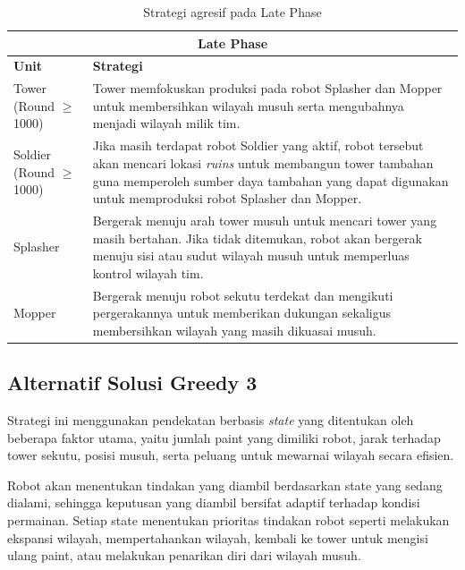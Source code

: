 \documentclass{article}
\renewcommand{\arraystretch}{1.3}
\begin{document}
\begin{table}[H]
\centering
\renewcommand{\arraystretch}{1.2}
\begin{tabular}{|p{3cm}|p{11cm}|}
\hline
\multicolumn{2}{|c|}{\textbf{Late Phase}} \\
\hline
\textbf{Unit} & \textbf{Strategi} \\
\hline

Tower (Round $\geq$ 1000) &
Tower memfokuskan produksi pada robot Splasher dan Mopper untuk membersihkan wilayah musuh serta mengubahnya menjadi wilayah milik tim. \\
\hline

Soldier (Round $\geq$ 1000) &
Jika masih terdapat robot Soldier yang aktif, robot tersebut akan mencari lokasi \textit{ruins} untuk membangun tower tambahan guna memperoleh sumber daya tambahan yang dapat digunakan untuk memproduksi robot Splasher dan Mopper. \\
\hline

Splasher &
Bergerak menuju arah tower musuh untuk mencari tower yang masih bertahan. Jika tidak ditemukan, robot akan bergerak menuju sisi atau sudut wilayah musuh untuk memperluas kontrol wilayah tim. \\
\hline

Mopper &
Bergerak menuju robot sekutu terdekat dan mengikuti pergerakannya untuk memberikan dukungan sekaligus membersihkan wilayah yang masih dikuasai musuh. \\
\hline

\end{tabular}
\caption{Strategi agresif pada Late Phase}
\end{table}

\subsection{Alternatif Solusi Greedy 3}

Strategi ini menggunakan pendekatan berbasis \textit{state} yang ditentukan oleh beberapa faktor utama, yaitu jumlah paint yang dimiliki robot, jarak terhadap tower sekutu, posisi musuh, serta peluang untuk mewarnai wilayah secara efisien.

Robot akan menentukan tindakan yang diambil berdasarkan state yang sedang dialami, sehingga keputusan yang diambil bersifat adaptif terhadap kondisi permainan. Setiap state menentukan prioritas tindakan robot seperti melakukan ekspansi wilayah, mempertahankan wilayah, kembali ke tower untuk mengisi ulang paint, atau melakukan penarikan diri dari wilayah musuh.
\end{document}
